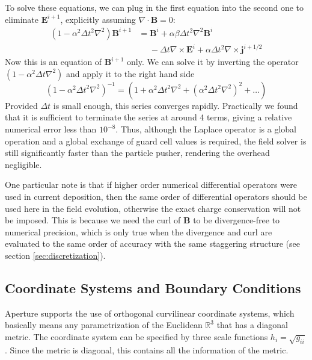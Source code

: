 To solve these equations, we can plug in the first equation into the second one
to eliminate $\mathbf{E}^{i+1}$, explicitly assuming $\nabla\cdot \mathbf{B} =
0$:
\begin{equation}
  \begin{split}
    (1 - \alpha^2\Delta t^2\nabla^2)\mathbf{B}^{i+1} &= \mathbf{B}^i + \alpha\beta \Delta t^2\nabla^2 \mathbf{B}^i \\
    &\phantom{=} -\Delta t\nabla\times \mathbf{E}^i + \alpha\Delta t^2\nabla\times \mathbf{j}^{i + 1/2}
  \end{split}
\end{equation}
Now this is an equation of $\mathbf{B}^{i+1}$ only. We can solve it by inverting
the operator $(1 - \alpha^2\Delta t\nabla^2)$ and apply it to the right hand side
\begin{equation}
  \label{eq:20}
  (1 - \alpha^2\Delta t^2\nabla^2)^{-1} = (1 + \alpha^2\Delta t^2\nabla^2 + (\alpha^2\Delta t^2\nabla^2)^2 + \dots)
\end{equation}
Provided $\Delta t$ is small enough, this series converges rapidly. Practically
we found that it is sufficient to terminate the series at around 4 terms, giving
a relative numerical error less than $10^{-8}$. Thus, although the Laplace
operator is a global operation and a global exchange of guard cell values is
required, the field solver is still significantly faster than the particle
pusher, rendering the overhead negligible.

One particular note is that if higher order numerical differential operators
were used in current deposition, then the same order of differential operators
should be used here in the field evolution, otherwise the exact charge
conservation will not be imposed. This is because we need the curl of
$\mathbf{B}$ to be divergence-free to numerical precision, which is only true
when the divergence and curl are evaluated to the same order of accuracy with
the same staggering structure (see section \ref{sec:discretization}).

\subsection{Coordinate Systems and Boundary Conditions}
\label{sec:coord-syst-sing}

Aperture supports the use of orthogonal curvilinear coordinate systems, which
basically means any parametrization of the Euclidean $\mathbb{R}^{3}$ that has a
diagonal metric. The coordinate system can be specified by three scale functions
$h_{i} = \sqrt{g_{ii}}$. Since the metric is diagonal, this contains all the
information of the metric.

